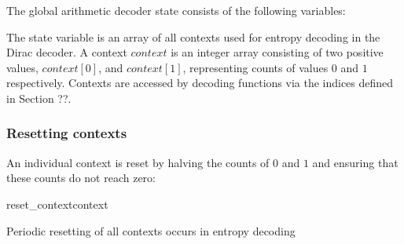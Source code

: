 \label{arithcontexts}

The global arithmetic decoder state consists of the following variables:

\begin{pseudo*}
\bsCODE{\ArithState:}
\end{pseudo*}

The state variable \AContexts is an array of all contexts
used for entropy decoding in the Dirac decoder. 
A context $context$ is an integer array consisting of two positive values,
$context[0]$, and $context[1]$, representing counts of values $0$ and $1$
respectively. Contexts are accessed by decoding functions
via the indices defined in Section ??.

\subsubsection{Resetting contexts}

An individual context is reset by halving the counts of $0$ and $1$ and ensuring that
these counts do not reach zero:

\begin{pseudo}{reset\_context}{context}
\end{pseudo}

Periodic resetting of all contexts occurs in entropy decoding 
